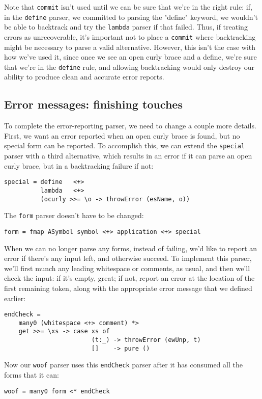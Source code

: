 \documentclass{tmr}
\begin{document}
Note that \verb+commit+ isn't used until we can be sure that we're in the right 
rule:  if, in the \verb+define+ parser, we committed to parsing the "define" 
keyword, we wouldn't be able to backtrack and try the \verb+lambda+ parser if 
that failed.  Thus, if treating errors as unrecoverable, it's important not to 
place a \verb+commit+ where backtracking might be necessary to parse a valid 
alternative.  However, this isn't the case with how we've used it, since once 
we see an open curly brace and a define, we're sure that we're in the \verb+define+
rule, and allowing backtracking would only destroy our ability to produce clean 
and accurate error reports.

\subsection{Error messages:  finishing touches}
To complete the error-reporting parser, we need to change a couple more details. 
First, we want an error reported when an open curly brace is found, but no 
special form can be reported.  To accomplish this, we can extend the \verb+special+ 
parser with a third alternative, which results in an error if it can parse
an open curly brace, but in a backtracking failure if not:
\begin{verbatim}
special = define   <+> 
          lambda   <+> 
          (ocurly >>= \o -> throwError (esName, o))
\end{verbatim}

The \verb+form+ parser doesn't have to be changed:
\begin{verbatim}
form = fmap ASymbol symbol <+> application <+> special
\end{verbatim}

When we can no longer parse any forms, instead of failing, we'd like to report an error if there's any input
left, and otherwise succeed.  To implement this parser, we'll first munch any leading whitespace or comments, 
as usual, and then we'll check the input:  if it's empty, great; if not, report an error at the location of the
first remaining token, along with the appropriate error message that we defined earlier:
\begin{verbatim}
endCheck = 
    many0 (whitespace <+> comment) *>
    get >>= \xs -> case xs of
                        (t:_) -> throwError (ewUnp, t)
                        []    -> pure ()
\end{verbatim}
Now our \verb+woof+ parser uses this \verb+endCheck+ parser after it has consumed all the forms that it can:
\begin{verbatim}
woof = many0 form <* endCheck
\end{verbatim}
\end{document}
